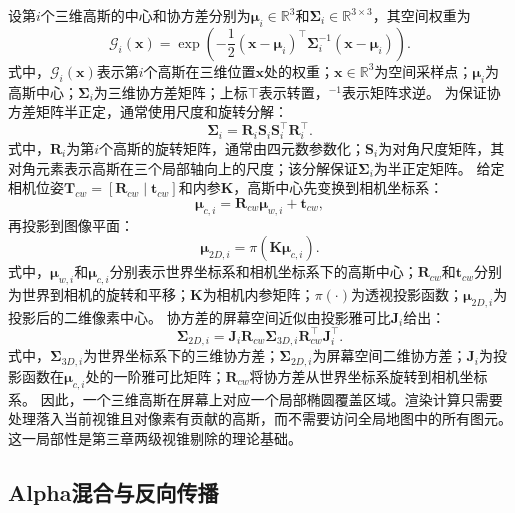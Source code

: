 设第$i$个三维高斯的中心和协方差分别为$\boldsymbol{\mu}_i\in\mathbb{R}^3$和$\boldsymbol{\Sigma}_i\in\mathbb{R}^{3\times3}$，其空间权重为
\begin{equation}
\mathcal{G}_i(\mathbf{x}) =
\exp\left(
-\frac{1}{2}
(\mathbf{x}-\boldsymbol{\mu}_i)^\top
\boldsymbol{\Sigma}_i^{-1}
(\mathbf{x}-\boldsymbol{\mu}_i)
\right).
\end{equation}
式中，$\mathcal{G}_i(\mathbf{x})$表示第$i$个高斯在三维位置$\mathbf{x}$处的权重；$\mathbf{x}\in\mathbb{R}^3$为空间采样点；$\boldsymbol{\mu}_i$为高斯中心；$\boldsymbol{\Sigma}_i$为三维协方差矩阵；上标$\top$表示转置，$^{-1}$表示矩阵求逆。
为保证协方差矩阵半正定，通常使用尺度和旋转分解：
\begin{equation}
\boldsymbol{\Sigma}_i=
\mathbf{R}_i\mathbf{S}_i\mathbf{S}_i^\top\mathbf{R}_i^\top.
\end{equation}
式中，$\mathbf{R}_i$为第$i$个高斯的旋转矩阵，通常由四元数参数化；$\mathbf{S}_i$为对角尺度矩阵，其对角元素表示高斯在三个局部轴向上的尺度；该分解保证$\boldsymbol{\Sigma}_i$为半正定矩阵。
给定相机位姿$\mathbf{T}_{cw}=[\mathbf{R}_{cw}\mid\mathbf{t}_{cw}]$和内参$\mathbf{K}$，高斯中心先变换到相机坐标系：
\begin{equation}
\boldsymbol{\mu}_{c,i}=\mathbf{R}_{cw}\boldsymbol{\mu}_{w,i}+\mathbf{t}_{cw},
\end{equation}
再投影到图像平面：
\begin{equation}
\boldsymbol{\mu}_{2D,i}=\pi(\mathbf{K}\boldsymbol{\mu}_{c,i}).
\end{equation}
式中，$\boldsymbol{\mu}_{w,i}$和$\boldsymbol{\mu}_{c,i}$分别表示世界坐标系和相机坐标系下的高斯中心；$\mathbf{R}_{cw}$和$\mathbf{t}_{cw}$分别为世界到相机的旋转和平移；$\mathbf{K}$为相机内参矩阵；$\pi(\cdot)$为透视投影函数；$\boldsymbol{\mu}_{2D,i}$为投影后的二维像素中心。
协方差的屏幕空间近似由投影雅可比$\mathbf{J}_i$给出：
\begin{equation}
\boldsymbol{\Sigma}_{2D,i}
=
\mathbf{J}_i\mathbf{R}_{cw}
\boldsymbol{\Sigma}_{3D,i}
\mathbf{R}_{cw}^{\top}\mathbf{J}_i^\top.
\end{equation}
式中，$\boldsymbol{\Sigma}_{3D,i}$为世界坐标系下的三维协方差；$\boldsymbol{\Sigma}_{2D,i}$为屏幕空间二维协方差；$\mathbf{J}_i$为投影函数在$\boldsymbol{\mu}_{c,i}$处的一阶雅可比矩阵；$\mathbf{R}_{cw}$将协方差从世界坐标系旋转到相机坐标系。
因此，一个三维高斯在屏幕上对应一个局部椭圆覆盖区域。渲染计算只需要处理落入当前视锥且对像素有贡献的高斯，而不需要访问全局地图中的所有图元。这一局部性是第三章两级视锥剔除的理论基础。

\subsection{Alpha混合与反向传播}

